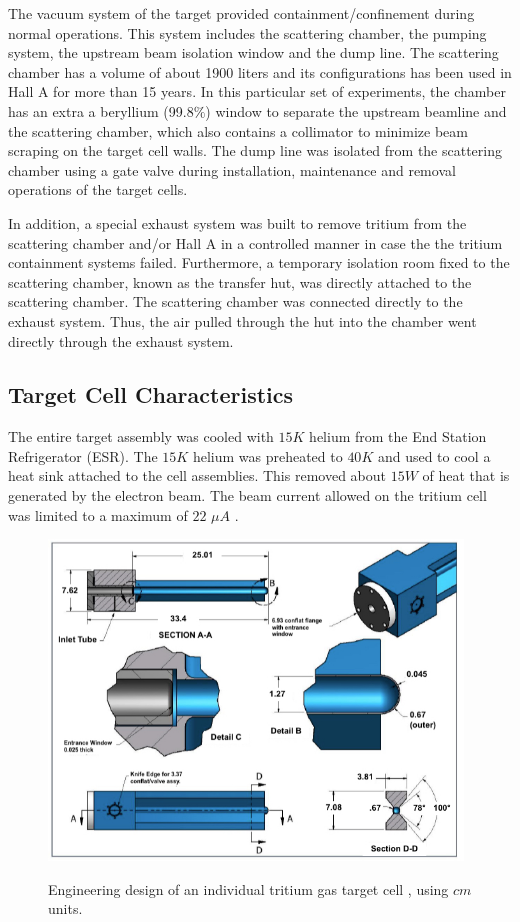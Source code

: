 \documentclass[preprint,12pt]{elsarticle}
\begin{document}
The vacuum system of the target provided containment/confinement during normal operations. This system includes the scattering chamber, the pumping system, the upstream beam isolation window and the dump line.  The scattering chamber has a volume of about 1900 liters and its configurations has been used in Hall A for more than 15 years. In this particular set of experiments, the chamber has an extra a beryllium (99.8$\%$) window to separate the upstream beamline and the scattering chamber, which also contains a collimator to minimize beam scraping on the target cell walls. The dump line was isolated from the scattering chamber using a gate valve during installation, maintenance and removal operations of the target cells. 

In addition, a special exhaust system was built to remove tritium from the scattering chamber and/or Hall A in a controlled manner in case the the tritium containment systems failed.  Furthermore, a temporary isolation room fixed to the scattering chamber, known as the transfer hut, was directly attached to the scattering chamber. The scattering chamber was connected directly to the exhaust system. Thus, the air pulled through the hut into the chamber went directly through the exhaust system.  

\subsection{Target Cell Characteristics}

The entire target assembly was cooled with $15K$ helium from the End Station Refrigerator (ESR). The $15K$ helium was preheated to $40K$ and used to cool a heat sink attached to the cell assemblies. This removed about $15W$ of heat that is generated by the electron beam. The beam current allowed on the tritium cell was limited to a maximum of $22$ $\mu A$ \cite{engreport}.


\begin{figure}
\centering
  \includegraphics[width=11cm]{images/tritium_cell.jpg}\\
  \caption{Engineering design of an individual tritium gas target cell \cite{celldes}, using $cm$ units.
 }\label{cell}
\end{figure}
\end{document}

